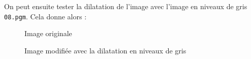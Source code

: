 \documentclass[french,a4paper,10pt]{article}
\begin{document}
	On peut ensuite tester la dilatation de l'image avec l'image en niveaux de gris \texttt{08.pgm}.
	Cela donne alors :
	\begin{figure}[!htb]
		\begin{minipage}{0.48\textwidth}
			\centering
			\caption{Image originale}\label{Fig:orig-08-3}
		\end{minipage}\hfill
		\begin{minipage}{0.48\textwidth}
			\centering
			\caption{Image modifiée avec la dilatation en niveaux de gris}\label{Fig:dilatation-grey-08}
		\end{minipage}
	\end{figure}
\end{document}
